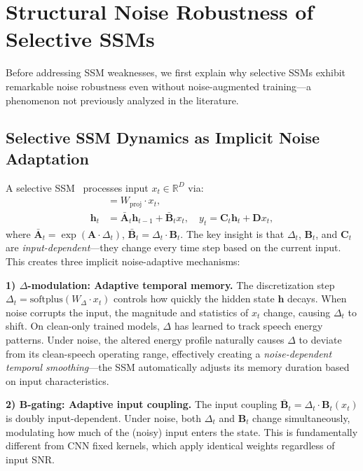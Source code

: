 \documentclass[journal]{IEEEtran}
\begin{document}
\section{Structural Noise Robustness of Selective SSMs}
\label{sec:structural}

Before addressing SSM weaknesses, we first explain why selective SSMs exhibit remarkable noise robustness even without noise-augmented training---a phenomenon not previously analyzed in the literature.

\subsection{Selective SSM Dynamics as Implicit Noise Adaptation}
\label{sec:ssm_dynamics}

A selective SSM~\cite{gu2024mamba} processes input $x_t \in \mathbb{R}^D$ via:
\begin{align}
[\Delta_t, \mathbf{B}_t, \mathbf{C}_t] &= W_{\text{proj}} \cdot x_t, \label{eq:proj} \\
\mathbf{h}_t &= \bar{\mathbf{A}}_t \mathbf{h}_{t-1} + \bar{\mathbf{B}}_t x_t, \quad
y_t = \mathbf{C}_t \mathbf{h}_t + \mathbf{D} x_t, \label{eq:ssm}
\end{align}
where $\bar{\mathbf{A}}_t = \exp(\mathbf{A} \cdot \Delta_t)$, $\bar{\mathbf{B}}_t = \Delta_t \cdot \mathbf{B}_t$.
The key insight is that $\Delta_t$, $\mathbf{B}_t$, and $\mathbf{C}_t$ are \emph{input-dependent}---they change every time step based on the current input.
This creates three implicit noise-adaptive mechanisms:

\smallskip\noindent\textbf{1) $\Delta$-modulation: Adaptive temporal memory.}
The discretization step $\Delta_t = \text{softplus}(W_\Delta \cdot x_t)$ controls how quickly the hidden state $\mathbf{h}$ decays.
When noise corrupts the input, the magnitude and statistics of $x_t$ change, causing $\Delta_t$ to shift.
On clean-only trained models, $\Delta$ has learned to track speech energy patterns.
Under noise, the altered energy profile naturally causes $\Delta$ to deviate from its clean-speech operating range, effectively creating a \emph{noise-dependent temporal smoothing}---the SSM automatically adjusts its memory duration based on input characteristics.

\smallskip\noindent\textbf{2) $\mathbf{B}$-gating: Adaptive input coupling.}
The input coupling $\bar{\mathbf{B}}_t = \Delta_t \cdot \mathbf{B}_t(x_t)$ is doubly input-dependent.
Under noise, both $\Delta_t$ and $\mathbf{B}_t$ change simultaneously, modulating how much of the (noisy) input enters the state.
This is fundamentally different from CNN fixed kernels, which apply identical weights regardless of input SNR.
\end{document}
